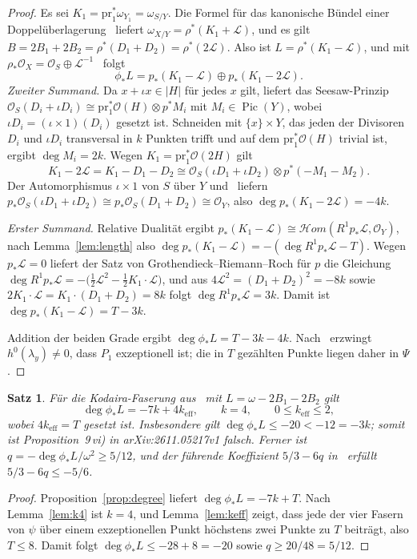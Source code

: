 \documentclass[11pt]{article}
\newtheorem{theorem}{Satz}[section]
\theoremstyle{definition}
\theoremstyle{remark}
\DeclareMathOperator{\Pic}{Pic}
\newcommand{\OO}{\mathcal{O}}
\newcommand{\cL}{\mathcal{L}}
\begin{document}
\begin{proof}
Es sei $K_1=\mathrm{pr}_1^*\omega_{Y_1}=\omega_{S/Y}$. Die Formel für das
kanonische Bündel einer Doppelüberlagerung~\cite[I.17]{BHPV04} liefert
$\omega_{X/Y}=\rho^*(K_1+\cL)$, und es gilt
$B=2B_1+2B_2=\rho^*(D_1+D_2)=\rho^*(2\cL)$. Also ist $L=\rho^*(K_1-\cL)$, und
mit $\rho_*\OO_X=\OO_S\oplus\cL^{-1}$~\cite[(13)]{So26} folgt
\[
\phi_*L=p_*(K_1-\cL)\oplus p_*(K_1-2\cL).
\]
\emph{Zweiter Summand.} Da $x+\iota x\in|H|$ für jedes $x$ gilt, liefert das
Seesaw-Prinzip $\OO_S(D_i+\iota D_i)\cong\mathrm{pr}_1^*\OO(H)\otimes p^*M_i$ mit
$M_i\in\Pic(Y)$, wobei $\iota D_i=(\iota\times 1)(D_i)$ gesetzt ist. Schneiden
mit $\{x\}\times Y$, das jeden der Divisoren $D_i$ und $\iota D_i$ transversal in
$k$ Punkten trifft und auf dem $\mathrm{pr}_1^*\OO(H)$ trivial ist, ergibt
$\deg M_i=2k$. Wegen $K_1=\mathrm{pr}_1^*\OO(2H)$ gilt
\[
K_1-2\cL=K_1-D_1-D_2\cong\OO_S(\iota D_1+\iota D_2)\otimes p^*(-M_1-M_2).
\]
Der Automorphismus $\iota\times 1$ von $S$ über $Y$ und~\cite[(20)]{So26} liefern
$p_*\OO_S(\iota D_1+\iota D_2)\cong p_*\OO_S(D_1+D_2)\cong\OO_Y$, also
$\deg p_*(K_1-2\cL)=-4k$.

\emph{Erster Summand.} Relative Dualität ergibt
$p_*(K_1-\cL)\cong\mathcal{H}om(R^1p_*\cL,\OO_Y)$, nach Lemma~\ref{lem:length}
also $\deg p_*(K_1-\cL)=-(\deg R^1p_*\cL-T)$. Wegen $p_*\cL=0$ liefert der Satz
von Grothendieck--Riemann--Roch für $p$ die Gleichung
$\deg R^1p_*\cL=-\bigl(\tfrac12\cL^2-\tfrac12K_1\cdot\cL\bigr)$, und aus
$4\cL^2=(D_1+D_2)^2=-8k$ sowie $2K_1\cdot\cL=K_1\cdot(D_1+D_2)=8k$ folgt
$\deg R^1p_*\cL=3k$. Damit ist $\deg p_*(K_1-\cL)=T-3k$.

Addition der beiden Grade ergibt $\deg\phi_*L=T-3k-4k$.
Nach~\cite[Prop.~5\,ii)]{So26} erzwingt $h^0(\lambda_y)\ne 0$, dass $P_1$
exzeptionell ist; die in $T$ gezählten Punkte liegen daher in $\Psi$.
\end{proof}

\begin{theorem}\label{thm:soule-count}
Für die Kodaira-Faserung aus~\cite{So26} mit $L=\omega-2B_1-2B_2$ gilt
\[
\deg\phi_*L=-7k+4k_{\mathrm{eff}},\qquad k=4,\qquad 0\le k_{\mathrm{eff}}\le 2,
\]
wobei $4k_{\mathrm{eff}}=T$ gesetzt ist. Insbesondere gilt
$\deg\phi_*L\le-20<-12=-3k$; somit ist Proposition~9\,vi) in arXiv:2611.05217v1
falsch. Ferner ist $q=-\deg\phi_*L/\omega^2\ge 5/12$, und der führende
Koeffizient $5/3-6q$ in~\cite[(36)]{So26} erfüllt $5/3-6q\le-5/6$.
\end{theorem}

\begin{proof}
Proposition~\ref{prop:degree} liefert $\deg\phi_*L=-7k+T$. Nach
Lemma~\ref{lem:k4} ist $k=4$, und Lemma~\ref{lem:keff} zeigt, dass jede der vier
Fasern von $\psi$ über einem exzeptionellen Punkt höchstens zwei Punkte zu $T$
beiträgt, also $T\le 8$. Damit folgt $\deg\phi_*L\le-28+8=-20$ sowie
$q\ge 20/48=5/12$.
\end{proof}
\end{document}
